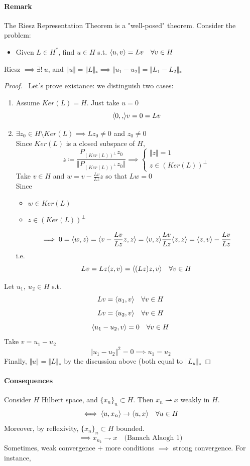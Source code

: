 \paragraph{Remark}
The Riesz Representation Theorem is a "well-posed" theorem.
Consider the problem:
\begin{itemize}
    \item Given $L\in H^*$, find $u\in H$ s.t. $\langle {u} , {v} \rangle =Lv\quad \forall v\in H$
\end{itemize}
Riesz $\implies \exists !\ u$, and $\Vert u\Vert =\Vert L\Vert _*\implies \Vert u_1-u_2\Vert =\Vert L_1-L_2\Vert _*$
\begin{proof}\ 
Let's prove existance: we distinguish two cases:
\begin{enumerate}
    \item Assume $Ker (L)=H$. Just take $u=0$
    $$\langle {0} , {,} \rangle v =0=Lv$$
    \item $\exists z_0\in H\setminus Ker(L) \implies Lz_0\neq 0$ and $z_0\neq 0$\\
    Since $Ker(L)$ is a closed subspace of $H$,
    $$z\coloneqq \frac{P_{(Ker(L))^\perp}z_0}{\Vert {P_{(Ker(L))^\perp}z_0\Vert}}\implies \begin{cases}
        \Vert z\Vert =1\\ z\in (Ker(L))^\perp
    \end{cases}$$
    Take $v\in H$ and $w =v-\frac{Lv}{Lz}z$ so that $Lw=0$\\
    Since
    \begin{itemize}
        \item $w \in Ker(L)$
        \item $z\in (Ker(L))^\perp$
    \end{itemize}
    $$\implies 0=\langle {w} , {z} \rangle = \langle {v-\frac{Lv}{Lz}z} , {z} \rangle=\langle {v} , {z} \rangle \frac{Lv}{Lz}\langle {z} , {z} \rangle = \langle {z} , {v} \rangle -\frac{Lv}{Lz}$$
    i.e. $$Lv=Lz\langle {z} , {v} \rangle =\langle {(Lz)z} , {v} \rangle \quad \forall v\in H$$
\end{enumerate}
Let $u_1,\ u_2\in H$ s.t. 
$$Lv=\langle {u_1} , {v} \rangle \quad \forall v\in H$$
$$Lv=\langle {u_2} , {v} \rangle \quad \forall v\in H$$
$$\langle {u_1-u_2} , {v} \rangle=0 \quad \forall v\in H$$
Take $v=u_1-u_2$
$$\Vert u_1-u_2\Vert^2=0\implies u_1=u_2$$
Finally, $\Vert u\Vert = \Vert L\Vert _*$ by the discussion above (both equal to $\Vert L_u\Vert_*$
\end{proof}
\paragraph{Consequences}
Consider $H$ Hilbert space, and $\{ x_n\}_n\subset H$. Then $x_n \rightharpoonup x$ weakly in $H$.
$$\iff \langle {u} , {x_n} \rangle\to \langle {u} , {x} \rangle \quad \forall u\in H$$
Moreover, by reflexivity, $\{x_n\}_n\subset H$ bounded.
$$\implies x_{n_k}\rightharpoondown x\quad \text{(Banach Alaogh 1)}$$
Sometimes, weak convergence + more conditions $\implies$ strong convergence. For instance,

